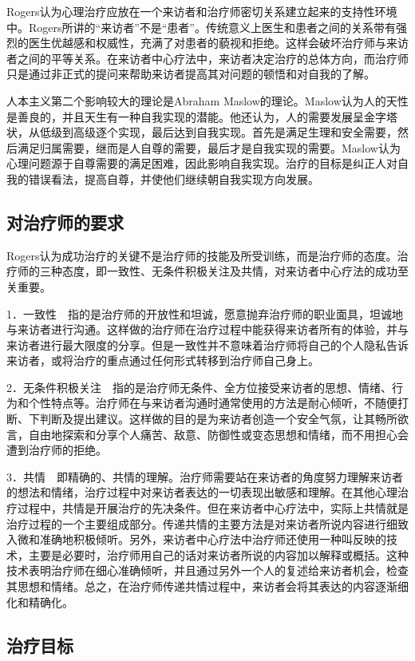 Rogers认为心理治疗应放在一个来访者和治疗师密切关系建立起来的支持性环境中。Rogers所讲的“来访者”不是“患者”。传统意义上医生和患者之间的关系带有强烈的医生优越感和权威性，充满了对患者的藐视和拒绝。这样会破坏治疗师与来访者之间的平等关系。在来访者中心疗法中，来访者决定治疗的总体方向，而治疗师只是通过非正式的提问来帮助来访者提高其对问题的顿悟和对自我的了解。

人本主义第二个影响较大的理论是Abraham
Maslow的理论。Maslow认为人的天性是善良的，并且天生有一种自我实现的潜能。他还认为，人的需要发展呈金字塔状，从低级到高级逐个实现，最后达到自我实现。首先是满足生理和安全需要，然后满足归属需要，继而是人自尊的需要，最后才是自我实现的需要。Maslow认为心理问题源于自尊需要的满足困难，因此影响自我实现。治疗的目标是纠正人对自我的错误看法，提高自尊，并使他们继续朝自我实现方向发展。

\subsection{对治疗师的要求}

Rogers认为成功治疗的关键不是治疗师的技能及所受训练，而是治疗师的态度。治疗师的三种态度，即一致性、无条件积极关注及共情，对来访者中心疗法的成功至关重要。

1．一致性　指的是治疗师的开放性和坦诚，愿意抛弃治疗师的职业面具，坦诚地与来访者进行沟通。这样做的治疗师在治疗过程中能获得来访者所有的体验，并与来访者进行最大限度的分享。但是一致性并不意味着治疗师将自己的个人隐私告诉来访者，或将治疗的重点通过任何形式转移到治疗师自己身上。

2．无条件积极关注　指的是治疗师无条件、全方位接受来访者的思想、情绪、行为和个性特点等。治疗师在与来访者沟通时通常使用的方法是耐心倾听，不随便打断、下判断及提出建议。这样做的目的是为来访者创造一个安全气氛，让其畅所欲言，自由地探索和分享个人痛苦、敌意、防御性或变态思想和情绪，而不用担心会遭到治疗师的拒绝。

3．共情　即精确的、共情的理解。治疗师需要站在来访者的角度努力理解来访者的想法和情绪，治疗过程中对来访者表达的一切表现出敏感和理解。在其他心理治疗过程中，共情是开展治疗的先决条件。但在来访者中心疗法中，实际上共情就是治疗过程的一个主要组成部分。传递共情的主要方法是对来访者所说内容进行细致入微和准确地积极倾听。另外，来访者中心疗法中治疗师还使用一种叫反映的技术，主要是必要时，治疗师用自己的话对来访者所说的内容加以解释或概括。这种技术表明治疗师在细心准确倾听，并且通过另外一个人的复述给来访者机会，检查其思想和情绪。总之，在治疗师传递共情过程中，来访者会将其表达的内容逐渐细化和精确化。

\subsection{治疗目标}

